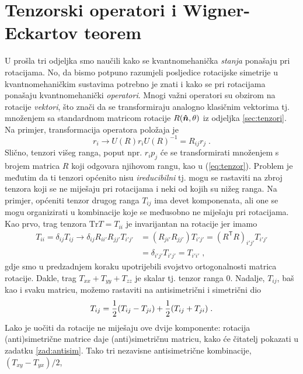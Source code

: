 \section{Tenzorski operatori i Wigner-Eckartov teorem}
\label{sec:tenzorskioperatori}

U prošla tri odjeljka smo naučili kako se kvantnomehanička \emph{stanja}
ponašaju pri rotacijama.
No, da bismo potpuno razumjeli posljedice rotacijske simetrije u
kvantnomehaničkim sustavima
potrebno je znati i kako se pri rotacijama ponašaju kvantnomehanički
\emph{operatori}. Mnogi važni operatori su obzirom na rotacije \emph{vektori},
što znači da se transformiraju analogno klasičnim vektorima tj. množenjem
sa standardnom matricom rotacije $R(\unitn, \theta)$ iz odjeljka
\ref{sec:tenzori}. Na primjer, transformacija operatora položaja je
\begin{equation}
    r_i \longrightarrow U(R) r_i U(R)^{-1} = R_{ij} r_j \;.
\end{equation}
Slično, tenzori višeg ranga, poput npr. $r_i p_j$ će se transformirati
množenjem s brojem matrica $R$ koji odgovara njihovom rangu, kao
u (\ref{eq:tenzor}). Problem je međutim da ti tenzori općenito nisu
\emph{ireducibilni} tj. mogu se rastaviti na zbroj tenzora
koji se ne miješaju pri rotacijama i neki od kojih su
nižeg ranga. Na primjer, općeniti tenzor drugog ranga $T_{ij}$ ima
devet komponenata, ali one se mogu organizirati u kombinacije
koje se međusobno ne miješaju pri rotacijama. 
Kao prvo, trag tenzora $\mathrm{Tr} T = T_{ii}$ je invarijantan
na rotacije jer imamo
\begin{align*}
 T_{ii} = \delta_{ij} T_{ij} \longrightarrow
\delta_{ij} R_{i i'} R_{j j'} T_{i' j'}& = (R_{j i'} R_{j j'}) T_{i' j'}
= (R^{\mathsf{T}} R)_{i' j'} T_{i' j'} \\
& = \delta_{i' j'} T_{i' j'} = T_{i' i'} \;,
\end{align*}
gdje smo u predzadnjem koraku upotrijebili svojstvo ortogonalnosti
matrica rotacije. Dakle, trag 
 $T_{xx} + T_{yy} + T_{zz}$ je skalar tj. tenzor ranga 0.
Nadalje, $T_{ij}$, baš kao i svaku matricu, možemo
rastaviti na antisimetrični i simetrični dio
\begin{equation}
  T_{ij} = \frac{1}{2} (T_{ij} - T_{ji}) + \frac{1}{2} (T_{ij} + T_{ji}) \;.
\label{eq:SplA}
\end{equation}
Lako je uočiti da rotacije ne miješaju ove dvije komponente:
rotacija (anti)si\-met\-ri\-čne matrice daje (anti)simetričnu matricu,
kako će čitatelj pokazati u zadatku \ref{zad:antisim}.
Tako tri nezavisne antisimetrične kombinacije, $(T_{xy}-T_{yx})/2$,
